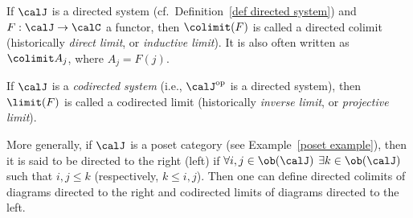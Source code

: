 \begin{defn}
    If $\calJ$ is a directed system (cf.\ Definition~\ref{def directed system}) and $F:\calJ\to \calC$ a functor, then $\colimit(F)$ is called a directed colimit (historically \emph{direct limit}, or \emph{inductive limit}).  It is also often written as $\colimit A_j$, where $A_j=F(j)$. 
    
    If $\calJ$ is a \emph{codirected system}  (i.e., $\calJ^{\mathrm{op}}$ is a directed system), then $\limit(F)$ is called a codirected limit (historically \emph{inverse limit}, or \emph{projective limit}). 
    
    More generally, if $\calJ$ is a poset category (see Example~\ref{poset example}), then it is said to be directed to the right (left) if $\forall i,j\in \ob(\calJ)$ $\exists k\in \ob(\calJ)$ such that $i,j\leq k$ (respectively, $k\leq i,j$). Then one can define directed colimits of diagrams directed to the right and codirected limits of diagrams directed to the left.
\end{defn}


